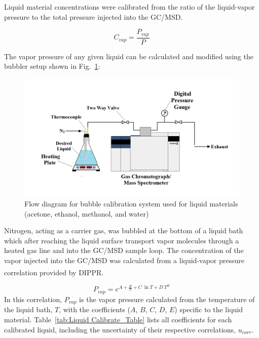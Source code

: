 \documentclass[12pt]{article}
\begin{document}
Liquid material concentrations were calibrated from the ratio of the liquid-vapor pressure to the total pressure injected into the GC/MSD.

\begin{equation}
\label{eq:liquid_vapor_concentration}
C_{vap} =\frac {P_{vap}}{P}
\end{equation}

The vapor pressure of any given liquid can be calculated and modified using the bubbler setup shown in Fig.~\ref{fig:Bubbler}: 

\begin{figure}[h!]
	\centering
\includegraphics[width=\textwidth,keepaspectratio]{Bubbler_Setup.png}
	\caption[Flow diagram for bubble calibration system used for liquid materials]{Flow diagram for bubble calibration system used for liquid materials (acetone, ethanol, methanol, and water)}
	\label{fig:Bubbler}
\end{figure}
Nitrogen, acting as a carrier gas, was bubbled at the bottom of a liquid bath which after reaching the liquid surface transport vapor molecules through a heated gas line and into the GC/MSD sample loop. The concentration of the vapor injected into the GC/MSD was calculated from a liquid-vapor pressure correlation provided by DIPPR\textsuperscript{\textregistered}.

\begin{equation}
\label{eq:liquid_vapor_pressure_correlation}
P_{vap} =e^{A+\frac{B}{T}+C~\ln{T}+D~T^{E}}
\end{equation}
In this correlation, $P_{vap}$ is the vapor pressure calculated from the temperature of the liquid bath, $T$, with the coefficients ($A$, $B$, $C$, $D$, $E$) specific to the liquid material. Table~\ref{tab:Liquid Calibrate_Table} lists all coefficients for each calibrated liquid, including the uncertainty of their respective correlations, $u_{corr}$. 
\end{document}
